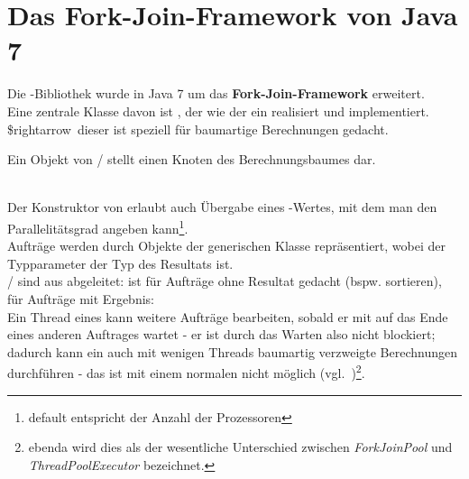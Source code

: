 \section{Das Fork-Join-Framework von Java 7}

Die -Bibliothek wurde in Java 7 um das \textbf{Fork-Join-Framework} erweitert.\\

\noindent
Eine zentrale Klasse davon ist , der wie der  ein  realisiert und  implementiert.\\

\noindent
\$rightarrow\ dieser  ist speziell für baumartige Berechnungen gedacht.\\

\begin{tcolorbox}
Ein Objekt von  /  stellt einen Knoten des Berechnungsbaumes dar.
\end{tcolorbox}\\

\noindent
Der Konstruktor von  erlaubt auch Übergabe eines -Wertes, mit dem man den Parallelitätsgrad angeben kann\footnote{default entspricht der Anzahl der Prozessoren}.\\

\noindent
Aufträge werden durch Objekte der generischen Klasse  repräsentiert, wobei der Typparameter der Typ des Resultats ist.\\

\noindent
{}/ sind aus  abgeleitet:  ist für Aufträge ohne Resultat gedacht (bspw. sortieren),  für Aufträge mit Ergebnis:\\

\noindent
Ein Thread eines  kann weitere Aufträge bearbeiten, sobald er mit  auf das Ende eines anderen Auftrages wartet - er ist durch das Warten also nicht blockiert; dadurch kann ein  auch mit wenigen Threads baumartig verzweigte Berechnungen durchführen - das ist mit einem normalen  nicht möglich (vgl.~\cite[168]{Oec22})\footnote{
ebenda wird dies als der wesentliche Unterschied zwischen \textit{ForkJoinPool} und \textit{ThreadPoolExecutor} bezeichnet.
}.\\

